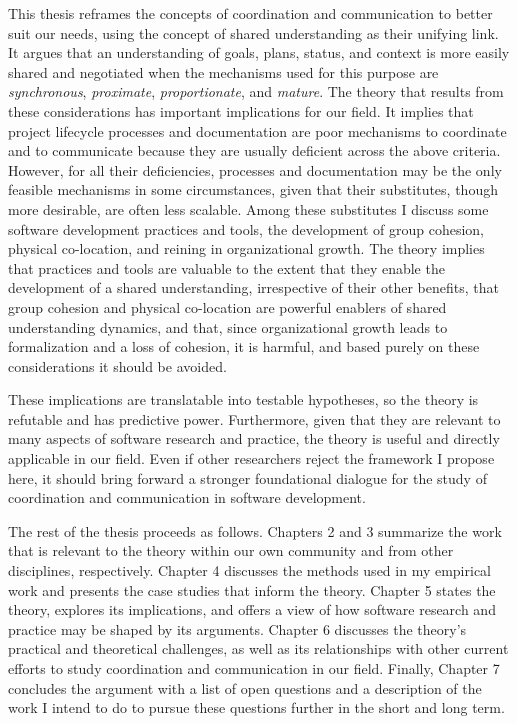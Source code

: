 This thesis reframes the concepts of coordination and communication to better suit our needs, using the concept of shared understanding as their unifying link. It argues that an understanding of goals, plans, status, and context is more easily shared and negotiated when the mechanisms used for this purpose are \emph{synchronous}, \emph{proximate}, \emph{proportionate}, and \emph{mature}. The theory that results from these considerations has important implications for our field. It implies that project lifecycle processes and documentation are poor mechanisms to coordinate and to communicate because they are usually deficient across the above criteria. However, for all their deficiencies, processes and documentation may be the only feasible mechanisms in some circumstances, given that their substitutes, though more desirable, are often less scalable. Among these substitutes I discuss some software development practices and tools, the development of group cohesion, physical co-location, and reining in organizational growth. The theory implies that practices and tools are valuable to the extent that they enable the development of a shared understanding, irrespective of their other benefits, that group cohesion and physical co-location are powerful enablers of shared understanding dynamics, and that, since organizational growth leads to formalization and a loss of cohesion, it is harmful, and based purely on these considerations it should be avoided.

These implications are translatable into testable hypotheses, so the theory is refutable and has predictive power. Furthermore, given that they are relevant to many aspects of software research and practice, the theory is useful and directly applicable in our field. Even if other researchers reject the framework I propose here, it should bring forward a stronger foundational dialogue for the study of coordination and communication in software development.

The rest of the thesis proceeds as follows. Chapters 2 and 3 summarize the work that is relevant to the theory within our own community and from other disciplines, respectively. Chapter 4 discusses the methods used in my empirical work and presents the case studies that inform the theory. Chapter 5 states the theory, explores its implications, and offers a view of how software research and practice may be shaped by its arguments. Chapter 6 discusses the theory's practical and theoretical challenges, as well as its relationships with other current efforts to study coordination and communication in our field. Finally, Chapter 7 concludes the argument with a list of open questions and a description of the work I intend to do to pursue these questions further in the short and long term.
